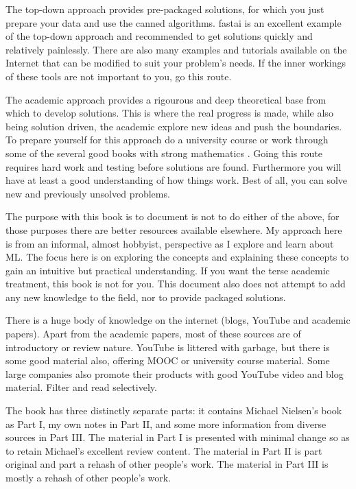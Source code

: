 The top-down approach provides pre-packaged solutions, for which you just prepare your data and use the canned algorithms. fastai \cite{fastai2019} is an excellent example of the top-down approach and recommended to get solutions quickly and relatively painlessly. There are also many examples and tutorials available on the Internet that can be modified to suit your problem's needs.  If the inner workings of these tools are not important to you, go this route. 

The academic approach provides a rigourous and deep theoretical base from which to develop solutions.  This is where the real progress is made, while also being solution driven, the academic explore new ideas and push the boundaries. To prepare yourself for this approach do a university course or work through some of the several good books with strong mathematics  \cite{geron2017handson,Webb2002statpatn,Michie94,theodoridis2003,Duda2001,Bishop1995,Bishop2006,Goodfellow2016}. 
Going this route requires hard work and testing before solutions are found. Furthermore you will have at least a good understanding of how things work. Best of all, you can solve new and previously unsolved problems.

The purpose with this book is to document is not to do either of the above, for those purposes there are better resources available elsewhere.  My approach here is from an informal, almost hobbyist, perspective as I explore and learn about \ac{ML}. The focus here is on exploring the concepts and explaining these concepts to gain an intuitive but practical understanding.  If you want the terse academic treatment, this book is not for you. This document also does not attempt to add any new knowledge to the field, nor to provide packaged solutions.

There is a huge body of knowledge on the internet (blogs, YouTube and academic papers). Apart from the academic papers, most of these sources are of introductory or review nature. YouTube is littered with garbage,  but there is some good material also, offering \ac{MOOC} or university course material. Some large companies also promote their products with good YouTube video and blog material. Filter and read selectively.

The book has three distinctly separate parts: it contains Michael Nielsen's book as Part I, my own notes in Part II, and some more information from diverse sources in Part III.  The material in Part I is presented with minimal change so as to retain Michael's excellent review content.  The material in Part II is part original and part a rehash of other people's work. The material in Part III is mostly a rehash of other people's work.

